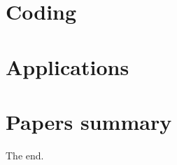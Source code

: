 \documentclass[oneside]{book}
\begin{document}
\part{Coding}\label{prt:coding}
% 
%
%
%





\part{Applications}\label{prt:apps}
%
%

\part{Papers summary}\label{prt:papers}

The end.  %


\clearpage
\end{document}
